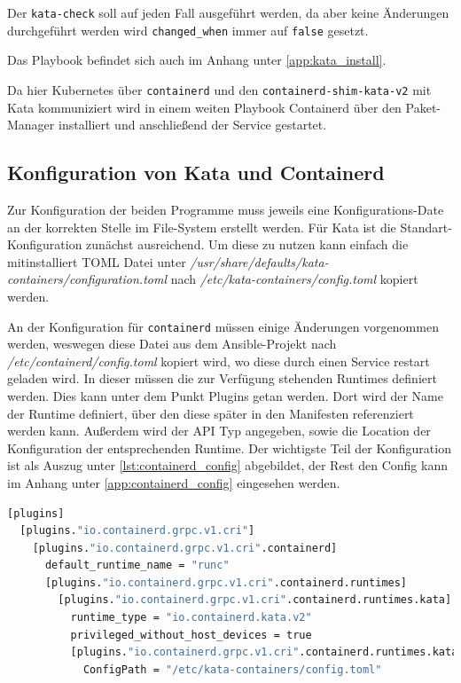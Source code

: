 Der \texttt{kata-check} soll auf jeden Fall ausgeführt werden, da aber keine Änderungen durchgeführt werden wird \texttt{changed\_when} immer auf \texttt{false} gesetzt.

Das Playbook befindet sich auch im Anhang unter \ref{app:kata_install}.

Da hier Kubernetes über \texttt{containerd} und den \texttt{containerd-shim-kata-v2} mit Kata kommuniziert wird in einem weiten Playbook Containerd über den Paket-Manager installiert und anschließend der Service gestartet.


\subsection{Konfiguration von Kata und Containerd}
\label{ref:kata_config}

Zur Konfiguration der beiden Programme muss jeweils eine Konfigurations-Date an der korrekten Stelle im File-System erstellt werden.
Für Kata ist die Standart-Konfiguration zunächst ausreichend. 
Um diese zu nutzen kann einfach die mitinstalliert \ac{TOML} Datei unter \textit{/usr/share/defaults/kata-containers/configuration.toml} nach \textit{/etc/kata-containers/config.toml} kopiert werden.

An der Konfiguration für \texttt{containerd} müssen einige Änderungen vorgenommen werden, weswegen diese Datei aus dem Ansible-Projekt nach \textit{/etc/containerd/config.toml} kopiert wird, wo diese durch einen Service restart geladen wird.
In dieser müssen die zur Verfügung stehenden Runtimes definiert werden.
Dies kann unter dem Punkt Plugins getan werden.
Dort wird der Name der Runtime definiert, über den diese später in den Manifesten referenziert werden kann.
Außerdem wird der \ac{API} Typ angegeben, sowie die Location der Konfiguration der entsprechenden Runtime.
Der wichtigste Teil der Konfiguration ist als Auszug unter \ref{lst:containerd_config} abgebildet, der Rest den Config kann im Anhang unter \ref{app:containerd_config} eingesehen werden.

\begin{lstlisting}[language=bash, caption={/etc/contaienrd/config.toml}, label={lst:containerd_config}]
[plugins]
  [plugins."io.containerd.grpc.v1.cri"]
    [plugins."io.containerd.grpc.v1.cri".containerd]
      default_runtime_name = "runc"
      [plugins."io.containerd.grpc.v1.cri".containerd.runtimes]
        [plugins."io.containerd.grpc.v1.cri".containerd.runtimes.kata]
          runtime_type = "io.containerd.kata.v2"
          privileged_without_host_devices = true
          [plugins."io.containerd.grpc.v1.cri".containerd.runtimes.kata.options]
            ConfigPath = "/etc/kata-containers/config.toml"
\end{lstlisting}

